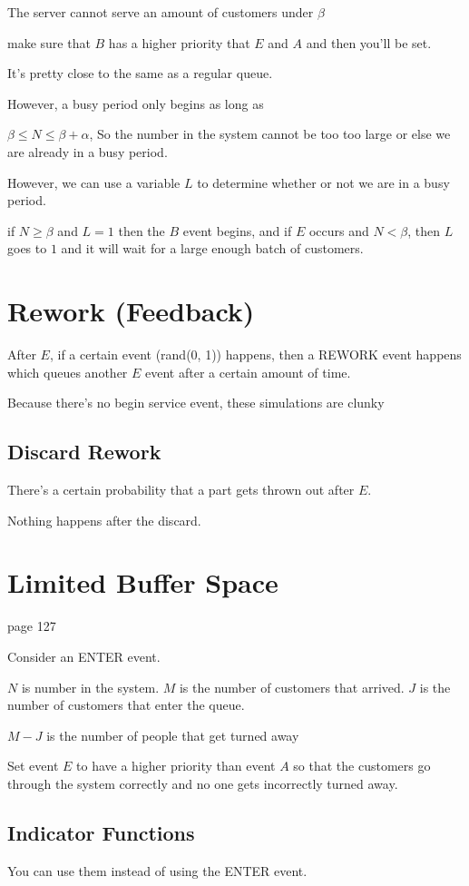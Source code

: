\documentclass[fleqn]{report}
\begin{document}
The server cannot serve an amount of customers under $\beta$

make sure that $B$ has a higher priority that $E$ and $A$ and then you'll
be set. 

It's pretty close to the same as a regular queue.

However, a busy period only begins as long as 

$\beta \leq N \leq \beta + \alpha$,
So the number in the system cannot be too too large or else we 
are already in a busy period. 

However, we can use a variable $L$ to determine whether or not we 
are in a busy period. 

if $N \geq \beta$ and $L = 1$ then the $B$ event begins, and 
if $E$ occurs and $N < \beta$, then $L$ goes to $1$ and it will 
wait for a large enough batch of customers. 

\section{Rework (Feedback)}
After $E$, if a certain event (rand(0, 1)) happens, then a REWORK 
event happens which queues another $E$ event after a certain amount of time. 

Because there's no begin service event, these simulations are clunky 

\subsection{Discard Rework}
There's a certain probability that a part gets thrown out after $E$. 

Nothing happens after the discard. 

\section{Limited Buffer Space}
page 127 

Consider an ENTER event. 

$N$ is number in the system. $M$ is the number of customers that arrived. 
$J$ is the number of customers that enter the queue.

$M - J$ is the number of people that get turned away 

Set event $E$ to have a higher priority than event $A$ so that 
the customers go through the system correctly and no one 
gets incorrectly turned away. 

\subsection{Indicator Functions}
You can use them instead of using the ENTER event. 
\end{document}
